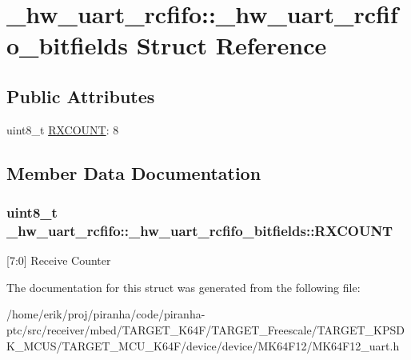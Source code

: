 \hypertarget{struct__hw__uart__rcfifo_1_1__hw__uart__rcfifo__bitfields}{}\section{\+\_\+hw\+\_\+uart\+\_\+rcfifo\+:\+:\+\_\+hw\+\_\+uart\+\_\+rcfifo\+\_\+bitfields Struct Reference}
\label{struct__hw__uart__rcfifo_1_1__hw__uart__rcfifo__bitfields}
\subsection*{Public Attributes}
\begin{DoxyCompactItemize}
\item 
uint8\+\_\+t \hyperlink{struct__hw__uart__rcfifo_1_1__hw__uart__rcfifo__bitfields_a2e8b8e557b8c9aa669d4de175c4818d7}{R\+X\+C\+O\+U\+NT}\+: 8
\end{DoxyCompactItemize}


\subsection{Member Data Documentation}
\subsubsection[{\texorpdfstring{R\+X\+C\+O\+U\+NT}{RXCOUNT}}]{\setlength{\rightskip}{0pt plus 5cm}uint8\+\_\+t \+\_\+hw\+\_\+uart\+\_\+rcfifo\+::\+\_\+hw\+\_\+uart\+\_\+rcfifo\+\_\+bitfields\+::\+R\+X\+C\+O\+U\+NT}\hypertarget{struct__hw__uart__rcfifo_1_1__hw__uart__rcfifo__bitfields_a2e8b8e557b8c9aa669d4de175c4818d7}{}\label{struct__hw__uart__rcfifo_1_1__hw__uart__rcfifo__bitfields_a2e8b8e557b8c9aa669d4de175c4818d7}
\mbox{[}7\+:0\mbox{]} Receive Counter 

The documentation for this struct was generated from the following file\+:\begin{DoxyCompactItemize}
\item 
/home/erik/proj/piranha/code/piranha-\/ptc/src/receiver/mbed/\+T\+A\+R\+G\+E\+T\+\_\+\+K64\+F/\+T\+A\+R\+G\+E\+T\+\_\+\+Freescale/\+T\+A\+R\+G\+E\+T\+\_\+\+K\+P\+S\+D\+K\+\_\+\+M\+C\+U\+S/\+T\+A\+R\+G\+E\+T\+\_\+\+M\+C\+U\+\_\+\+K64\+F/device/device/\+M\+K64\+F12/M\+K64\+F12\+\_\+uart.\+h\end{DoxyCompactItemize}
